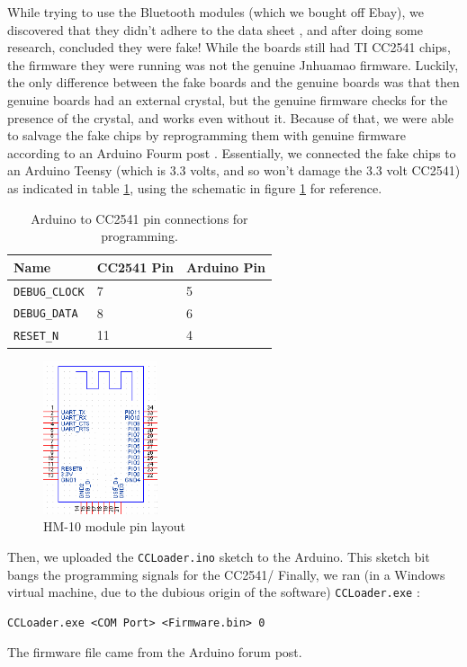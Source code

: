 \documentclass[]{article}
\begin{document}
While trying to use the Bluetooth modules (which we bought off Ebay), we discovered that they didn't adhere to the data sheet \cite{jnhuamaodatasheet}, and after doing some research, concluded they were fake!
While the boards still had TI CC2541 chips, the firmware they were running was not the genuine Jnhuamao firmware.
Luckily, the only difference between the fake boards and the genuine boards was that then genuine boards had an external crystal, but the genuine firmware checks for the presence of the crystal, and works even without it. \cite{crystal}
Because of that, we were able to salvage the fake chips by reprogramming them with genuine firmware according to an Arduino Fourm post \cite{crystal}.
Essentially, we connected the fake chips to an Arduino Teensy (which is 3.3 volts, and so won't damage the 3.3 volt CC2541) as indicated in table \ref{table:progpins}, using the schematic in figure \ref{fig:hm10} for reference.

\begin{table}[]
  \centering
  \begin{tabular}{@{}lll@{}}
    \toprule
    Name & CC2541 Pin & Arduino Pin\tabularnewline
    \midrule
    \texttt{DEBUG\_CLOCK} & 7 & 5\tabularnewline
    \texttt{DEBUG\_DATA} & 8 & 6\tabularnewline
    \texttt{RESET\_N} & 11 & 4\tabularnewline
    \bottomrule
  \end{tabular}
  \caption{Arduino to CC2541 pin connections for programming.}
  \label{table:progpins}
\end{table}

\begin{figure}
  \centering
  \includegraphics[width=0.3\textwidth]{hm10_pins.png}
  \caption{HM-10 module pin layout \cite{crystal}}
  \label{fig:hm10}
\end{figure}

Then, we uploaded the \texttt{CCLoader.ino} \cite{ccloader} sketch to the Arduino.
This sketch bit bangs the programming signals for the CC2541/
Finally, we ran (in a Windows virtual machine, due to the dubious origin of the software) \texttt{CCLoader.exe} \cite{ccloaderexe}:
\begin{Verbatim}[gobble=2]
  CCLoader.exe <COM Port> <Firmware.bin> 0
\end{Verbatim}
The firmware file came from the Arduino forum post. \cite{firmwarefile}
\end{document}
